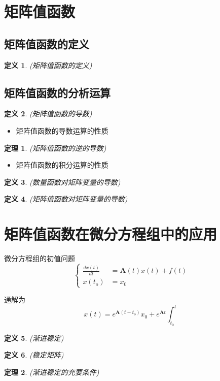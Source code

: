 \documentclass[twoside]{article}
\newtheorem{theorem}{定理}[section]
\newtheorem{definition}{定义}[section]
\begin{document}
\section{矩阵值函数}
\subsection{矩阵值函数的定义}
\begin{definition}
  (矩阵值函数的定义)
\end{definition}

\subsection{矩阵值函数的分析运算}
\begin{definition}
  (矩阵值函数的导数)
\end{definition}

\begin{itemize}
  \item 矩阵值函数的导数运算的性质
\end{itemize}

\begin{theorem}
  (矩阵值函数的逆的导数)
\end{theorem}

\begin{itemize}
  \item 矩阵值函数的积分运算的性质
\end{itemize}

\begin{definition}
  (数量函数对矩阵变量的导数)
\end{definition}

\begin{definition}
  (矩阵值函数对矩阵变量的导数)
\end{definition}

\section{矩阵值函数在微分方程组中的应用}
微分方程组的初值问题
\begin{equation}
  \left\{
    \begin{aligned}
      \frac{dx(t)}{dt} &= \mathbf{A}(t)x(t) + f(t) \\
      x(t_o) &= x_0
    \end{aligned}
  \right.
\end{equation}

通解为
\begin{equation}
  x(t) = e^{\mathbf{A}(t-t_o)} x_0 + e^{\mathbf{A}t}\int^t_{t_0} 
\end{equation}

\begin{definition}
  (渐进稳定)
\end{definition}

\begin{definition}
  (稳定矩阵)
\end{definition}

\begin{theorem}
  (渐进稳定的充要条件)
\end{theorem}
\end{document}
